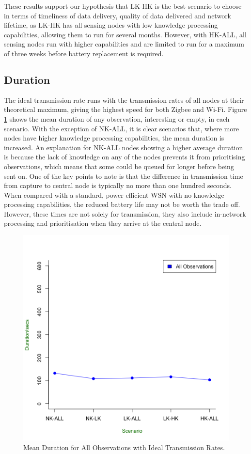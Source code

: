 These results support our hypothesis that LK-HK is the best scenario to choose in terms of timeliness of data delivery, quality of data delivered and network lifetime, as LK-HK has all sensing nodes with low knowledge processing capabilities, allowing them to run for several months. However, with HK-ALL, all sensing nodes run with higher capabilities and are limited to run for a maximum of three weeks before battery replacement is required.

\subsection{Duration}
The ideal transmission rate runs with the transmission rates of all nodes at their theoretical maximum, giving the highest speed for both Zigbee and Wi-Fi. Figure \ref{fig:res:ideal:dur} shows the mean duration of any observation, interesting or empty, in each scenario. With the exception of NK-ALL, it is clear scenarios that, where more nodes have higher knowledge processing capabilities, the mean duration is increased. An explanation for NK-ALL nodes showing a higher average duration is because the lack of knowledge on any of the nodes prevents it from prioritising observations, which means that some could be queued for longer before being sent on. One of the key points to note is that the difference in transmission time from capture to central node is typically no more than one hundred seconds. When compared with a standard, power efficient WSN with no knowledge processing capabilities, the reduced battery life may not be worth the trade off. However, these times are not solely for transmission, they also include in-network processing and prioritisation when they arrive at the central node. 

	\begin{figure}[h]
	\centering
	\includegraphics[width=\textwidth]{Chap7/figures/ideal_all_dur}
	\caption{Mean Duration for All Observations with Ideal Transmission Rates.}
	\label{fig:res:ideal:dur}
	\end{figure}
	

